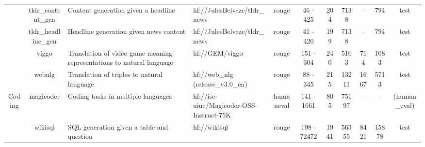 \begin{landscape}
\begin{table}[ht]
{\begin{tabular}{ccllccccccc}
                                   & tldr\_content\_gen                  & Content generation given a headline                                   & hf://JulesBelveze/tldr\_news                                 & rouge                            & 46 - 425                                  & 204                                     & 7138           & --                  & 794           & test                                                                    \\
                                   & tldr\_headline\_gen                 & Headline generation given news content                                & hf://JulesBelveze/tldr\_news                                 & rouge                            & 41 - 420                                  & 199                                     & 7138           & --                  & 794           & test                                                                    \\
                                   & viggo                               & Translation of video game meaning representations to natural language & hf://GEM/viggo                                               & rouge                            & 151 - 304                                 & 240                                     & 5103           & 714                 & 1083          & test                                                                    \\
                                   & webnlg                              & Translation of triples to natural language                            & hf://web\_nlg (release\_v3.0\_en)                            & rouge                            & 88 - 345                                  & 215                                     & 13211          & 1667                & 5713          & test                                                                    \\
\midrule
\multirow{2}{*}{Coding}            & magicoder                           & Coding tasks in multiple languages                                    & hf://ise-uiuc/Magicoder-OSS-Instruct-75K                     & humaneval                        & 141 - 1661                                & 805                                     & 75197          & --                  & --            & (human\_eval)                                                           \\
                                   & wikisql                             & SQL generation given a table and question                             & hf://wikisql                                                 & rouge                            & 198 - 72472                               & 1941                                    & 56355          & 8421                & 15878         & test                                                                    \\

\end{tabular}}
\end{table}
\end{landscape}
